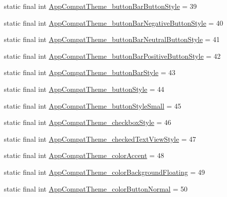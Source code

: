 \begin{DoxyCompactItemize}
\item 
static final int \mbox{\hyperlink{classandroid_1_1support_1_1design_1_1_r_1_1styleable_a3a8ca30886e2e70927639892678e86da}{App\+Compat\+Theme\+\_\+button\+Bar\+Button\+Style}} = 39
\item 
static final int \mbox{\hyperlink{classandroid_1_1support_1_1design_1_1_r_1_1styleable_a9832913cae5df0c7276bdeba84d493a5}{App\+Compat\+Theme\+\_\+button\+Bar\+Negative\+Button\+Style}} = 40
\item 
static final int \mbox{\hyperlink{classandroid_1_1support_1_1design_1_1_r_1_1styleable_a93c27bab63c81b49f205d10c88d85bb9}{App\+Compat\+Theme\+\_\+button\+Bar\+Neutral\+Button\+Style}} = 41
\item 
static final int \mbox{\hyperlink{classandroid_1_1support_1_1design_1_1_r_1_1styleable_a7a2887419ca217a16c24636def6eac17}{App\+Compat\+Theme\+\_\+button\+Bar\+Positive\+Button\+Style}} = 42
\item 
static final int \mbox{\hyperlink{classandroid_1_1support_1_1design_1_1_r_1_1styleable_a891b495744b4a474aa003b6ed3429ccc}{App\+Compat\+Theme\+\_\+button\+Bar\+Style}} = 43
\item 
static final int \mbox{\hyperlink{classandroid_1_1support_1_1design_1_1_r_1_1styleable_a0562e3f3b8f9c5242aea25e93a6d44d6}{App\+Compat\+Theme\+\_\+button\+Style}} = 44
\item 
static final int \mbox{\hyperlink{classandroid_1_1support_1_1design_1_1_r_1_1styleable_ad0a87f4f0dcf5a7b2fcaa746d8dc2d20}{App\+Compat\+Theme\+\_\+button\+Style\+Small}} = 45
\item 
static final int \mbox{\hyperlink{classandroid_1_1support_1_1design_1_1_r_1_1styleable_a60be24a34d157842da7c8e56ce479a18}{App\+Compat\+Theme\+\_\+checkbox\+Style}} = 46
\item 
static final int \mbox{\hyperlink{classandroid_1_1support_1_1design_1_1_r_1_1styleable_aaf59cc8afbc9b83e200636e9d7fec027}{App\+Compat\+Theme\+\_\+checked\+Text\+View\+Style}} = 47
\item 
static final int \mbox{\hyperlink{classandroid_1_1support_1_1design_1_1_r_1_1styleable_a488749863ea5bfa0082c9ea7517ec218}{App\+Compat\+Theme\+\_\+color\+Accent}} = 48
\item 
static final int \mbox{\hyperlink{classandroid_1_1support_1_1design_1_1_r_1_1styleable_aa5c2e467cdd7656d957a879184e4c51f}{App\+Compat\+Theme\+\_\+color\+Background\+Floating}} = 49
\item 
static final int \mbox{\hyperlink{classandroid_1_1support_1_1design_1_1_r_1_1styleable_a1799d5258bee7b517f6cca502206a00f}{App\+Compat\+Theme\+\_\+color\+Button\+Normal}} = 50

\end{DoxyCompactItemize}
